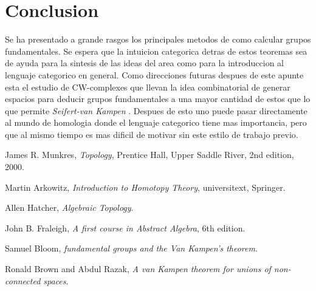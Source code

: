 \documentclass[letterpaper]{article}
\newcommand{\vank}{\emph{Seifert-van Kampen} }
\theoremstyle{definition}
\theoremstyle{plain}
\theoremstyle{plain}
\theoremstyle{plain}
\theoremstyle{plain}
\theoremstyle{remark}
\theoremstyle{remark}
\begin{document}
\section*{Conclusion}
Se ha presentado a grande rasgos los principales metodos de como
calcular grupos fundamentales. Se espera que la intuicion categorica
detras de estos teoremas sea de ayuda para la sintesis de las ideas del
area como para la introduccion al lenguaje categorico en general. Como
direcciones futuras despues de este apunte esta el estudio de
CW-complexes que llevan la idea combinatorial de generar espacios para
deducir grupos fundamentales a una mayor cantidad de estos que lo que
permite \vank . Despues de esto uno puede pasar directamente al mundo de
homologia donde el lenguaje categorico tiene mas importancia, pero que
al mismo tiempo es mas dificil de motivar sin este estilo de trabajo previo.
\begin{thebibliography}{9}

  James R. Munkres,
  \emph{Topology},
  Prentice Hall, Upper Saddle River,
  2nd edition,
  2000.

  Martin Arkowitz,
  \emph{Introduction to Homotopy Theory},
  universitext, Springer.

  Allen Hatcher,
  \emph{Algebraic Topology}.

  John B. Fraleigh,
  \emph{A first course in Abstract Algebra},
  6th edition.

  Samuel Bloom,
  \emph{fundamental  groups  and  the  Van  Kampen’s theorem}.

  Ronald Brown and Abdul Razak,
  \emph{A van Kampen theorem for unions of non-connected spaces}.
\end{thebibliography}
\end{document}
